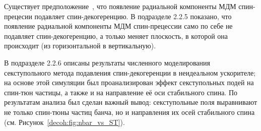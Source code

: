 Существует предположение~\cite[стр.~5]{Koop:SpinWheel2015}, что появление радиальной компоненты МДМ спин-прецесии подавляет спин-декогеренцию. В подразделе 2.2.5 показано, что появление 
радиальной компоненты МДМ спин-прецессии само по себе не подавляет спин-декогеренцию, 
а только меняет плоскость, в которой она происходит (из горизонтальной в вертикальную). 

В подразделе 2.2.6 описаны результаты численного моделирования секступольного метода 
подавления спин-декогеренции в неидеальном ускорителе; на основе этой симуляции был проанализирован
эффект секступольных подей на спин-тюн частицы, а также и на направление её оси стабильного спина. 
По результатам анализа был сделан важный вывод: секступольные поля выравнивают не только спин-тюны
частиц банча, но и направления их осей стабильного спина (см. Рисунок~\ref{decoh:fig:nbar_vs_ST}).

%
%

